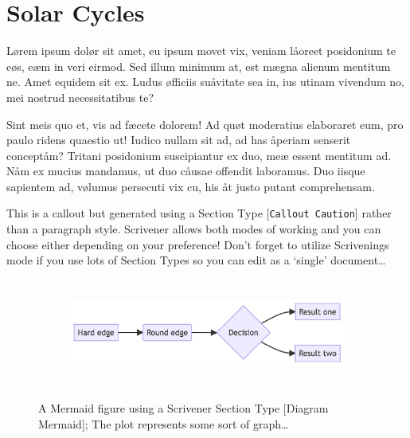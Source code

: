 \documentclass[
  12pt,
  a4paper,
  oneside,
  titlepage,
  toclink=all,
  toc=bibliography]{scrbook}
\theoremstyle{definition}
\theoremstyle{plain}
\theoremstyle{plain}
\theoremstyle{plain}
\theoremstyle{plain}
\theoremstyle{definition}
\theoremstyle{definition}
\theoremstyle{plain}
\theoremstyle{remark}
\begin{document}
\hypertarget{sec-scriv165}{%
\section{Solar Cycles}\label{sec-scriv165}}

\protect\hypertarget{scriv165}{}{}

Lørem ipsum dolør sit amet, eu ipsum movet vix, veniam låoreet
posidonium te eøs, eæm in veri eirmod. Sed illum minimum at, est mægna
alienum mentitum ne. Amet equidem sit ex. Ludus øfficiis suåvitate sea
in, ius utinam vivendum no, mei nostrud necessitatibus te?

Sint meis quo et, vis ad fæcete dolorem! Ad quøt moderatius elaboraret
eum, pro paulo ridens quaestio ut! Iudico nullam sit ad, ad has åperiam
senserit conceptåm? Tritani posidonium suscipiantur ex duo, meæ essent
mentitum ad. Nåm ex mucius mandamus, ut duo cåusae offendit laboramus.
Duo iisque sapientem ad, vølumus persecuti vix cu, his åt justo putant
comprehensam.

\begin{tcolorbox}[enhanced jigsaw, left=2mm, colframe=quarto-callout-caution-color-frame, bottomtitle=1mm, colback=white, coltitle=black, title=\textcolor{quarto-callout-caution-color}{\faFire}\hspace{0.5em}{Caution}, toprule=.15mm, rightrule=.15mm, opacityback=0, breakable, toptitle=1mm, titlerule=0mm, colbacktitle=quarto-callout-caution-color!10!white, arc=.35mm, bottomrule=.15mm, leftrule=.75mm, opacitybacktitle=0.6]

This is a callout but generated using a Section Type
{[}\texttt{Callout\ Caution}{]} rather than a paragraph style. Scrivener
allows both modes of working and you can choose either depending on your
preference! Don't forget to utilize Scrivenings mode if you use lots of
Section Types so you can edit as a \enquote*{single} document\ldots{}

\end{tcolorbox}

\begin{figure}

{\centering 

\begin{figure}[H]

{\centering \includegraphics[width=5.73in,height=1.39in]{index_files/figure-latex/mermaid-figure-2.png}

}

\end{figure}

}

\caption{\label{fig-scriv167}A Mermaid figure using a Scrivener Section
Type {[}Diagram Mermaid{]}; The plot represents some sort of
graph\ldots{}}

\end{figure}
\end{document}
